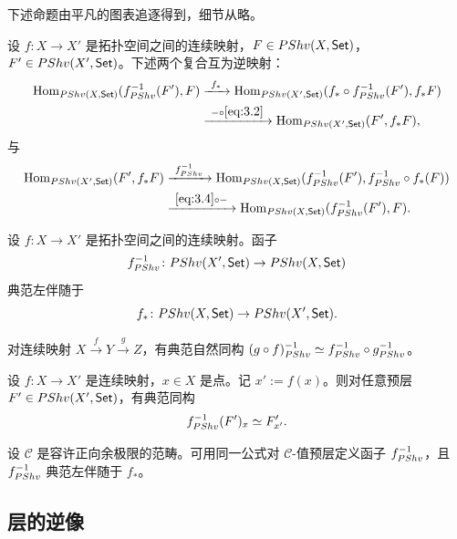 下述命题由平凡的图表追逐得到，细节从略。

\begin{proposition}\label{prop:3.3.9}
设 $f\colon X\to X'$ 是拓扑空间之间的连续映射，$F\in PShv(X,\mathsf{Set})$，$F'\in PShv(X',\mathsf{Set})$。下述两个复合互为逆映射：
\[
\begin{aligned}
\Hom_{\PShv(X,\Set)}(f_{\PShv}^{-1}(F'),F)
&\xrightarrow{\ f_*\ }\Hom_{\PShv(X',\Set)}(f_*\circ f_{\PShv}^{-1}(F'),f_*F)\\
&\xrightarrow{\ -\circ\eqref{eq:3.2}\ }\Hom_{\PShv(X',\Set)}(F',f_*F),
\end{aligned}
\]
与
\[
\begin{aligned}
\Hom_{\PShv(X',\Set)}(F',f_*F)
&\xrightarrow{\ f_{\PShv}^{-1}\ }\Hom_{\PShv(X,\Set)}(f_{\PShv}^{-1}(F'),f_{\PShv}^{-1}\circ f_*(F))\\
&\xrightarrow{\ \eqref{eq:3.4}\circ-\ }\Hom_{\PShv(X,\Set)}(f_{\PShv}^{-1}(F'),F).
\end{aligned}
\]
\end{proposition}

\begin{corollary}\label{cor:3.3.10}
设 $f\colon X\to X'$ 是拓扑空间之间的连续映射。函子
\[
f_{PShv}^{-1}\colon PShv(X',\mathsf{Set})\to PShv(X,\mathsf{Set})
\]
典范左伴随于
\[
f_*\colon PShv(X,\mathsf{Set})\to PShv(X',\mathsf{Set}).
\]
\end{corollary}

\begin{corollary}\label{cor:3.3.11}
对连续映射 $X\xrightarrow{\ f\ }Y\xrightarrow{\ g\ }Z$，有典范自然同构 $(g\circ f)_{PShv}^{-1}\simeq f_{PShv}^{-1}\circ g_{PShv}^{-1}$。
\end{corollary}

\begin{corollary}\label{cor:3.3.12}
设 $f\colon X\to X'$ 是连续映射，$x\in X$ 是点。记 $x':=f(x)$。则对任意预层 $F'\in PShv(X',\mathsf{Set})$，有典范同构
\[
f_{PShv}^{-1}(F')_x\simeq F'_{x'}.
\]
\end{corollary}

\begin{remark}\label{rem:3.3.13}
设 $\mathcal C$ 是容许正向余极限的范畴。可用同一公式对 $\mathcal C$-值预层定义函子 $f_{PShv}^{-1}$，且 $f_{PShv}^{-1}$ 典范左伴随于 $f_*$。
\end{remark}

\subsection{层的逆像}\label{sec:3.4}

